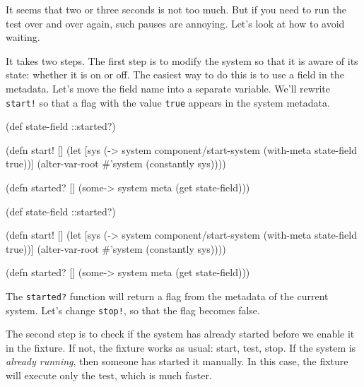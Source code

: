 It seems that two or three seconds is not too much. But if you need to run the test over and over again, such pauses are annoying. Let's look at how to avoid waiting.


It takes two steps. The first step is to modify the system so that it is aware of its state: whether it is on or off. The easiest way to do this is to use a field in the metadata. Let's move the field name into a separate variable. We'll rewrite \verb|start!| so that a flag with the value \verb|true| appears in the system metadata.

\ifx\DEVICETYPE\MOBILE

\begin{english}
  \begin{clojure}
(def state-field ::started?)

(defn start! []
  (let [sys
        (-> system
            component/start-system
            (with-meta
              {state-field true}))]
    (alter-var-root
      #'system (constantly sys))))

(defn started? []
  (some-> system meta (get state-field)))
  \end{clojure}
\end{english}

\else

\begin{english}
  \begin{clojure}
(def state-field ::started?)

(defn start! []
  (let [sys (-> system
                component/start-system
                (with-meta {state-field true}))]
    (alter-var-root #'system (constantly sys))))

(defn started? []
  (some-> system meta (get state-field)))
  \end{clojure}
\end{english}

\fi

The \verb|started?| function will return a flag from the metadata of the current system. Let's change \verb|stop!|, so that the flag becomes false.

The second step is to check if the system has already started before we enable it in the fixture. If not, the fixture works as usual: start, test, stop. If the system is \emph{already running}, then someone has started it manually. In this case, the fixture will execute only the test, which is much faster.

